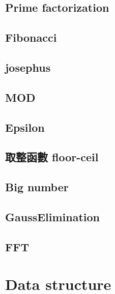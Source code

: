 \subsection{Prime factorization}


\subsection{Fibonacci}


\subsection{josephus}


\subsection{MOD}


\subsection{Epsilon}


\subsection{取整函數 floor-ceil}


\subsection{Big number}


\subsection{GaussElimination}


\subsection{FFT}






\section{Data structure}

